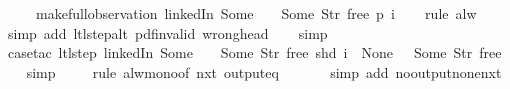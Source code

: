 \begin{isabellebody}
\ \ \ \ \ {\isacharparenleft}make{\isacharunderscore}full{\isacharunderscore}observation\ linkedIn\ {\isacharparenleft}Some\ {}{\isacharparenright}\ {\isacharparenleft}{\isacharless}{\isachargreater}{\isacharparenleft}{}\ {\isachardollar}{\isacharcolon}{\isacharequal}\ Some\ {\isacharparenleft}Str\ {\isacharprime}{\isacharprime}free{\isacharprime}{\isacharprime}{\isacharparenright}{\isacharparenright}{\isacharparenright}\ p\ i{\isacharparenright}{\isachardoublequoteclose}\isanewline
%
\isadelimproof
\ \ %
\endisadelimproof
%
\isatagproof
{}\isamarkupfalse%
\ {\isacharparenleft}rule\ alw{\isacharparenright}\isanewline
\ \ \ \isamarkupfalse%
\ {\isacharparenleft}simp\ add{\isacharcolon}\ ltl{\isacharunderscore}step{\isacharunderscore}alt\ pdf{\isacharunderscore}{}{\isacharunderscore}invalid\ wrong{\isacharunderscore}head{\isacharparenright}\isanewline
\ \ \isamarkupfalse%
\ simp\isanewline
\ \ \isamarkupfalse%
\ {\isacharparenleft}case{\isacharunderscore}tac\ {\isachardoublequoteopen}ltl{\isacharunderscore}step\ linkedIn\ {\isacharparenleft}Some\ {}{\isacharparenright}\ {\isacharparenleft}{\isacharless}{\isachargreater}{\isacharparenleft}{}\ {\isachardollar}{\isacharcolon}{\isacharequal}\ Some\ {\isacharparenleft}Str\ {\isacharprime}{\isacharprime}free{\isacharprime}{\isacharprime}{\isacharparenright}{\isacharparenright}{\isacharparenright}\ {\isacharparenleft}shd\ i{\isacharparenright}\ {\isacharequal}\ {\isacharparenleft}None{\isacharcomma}\ {\isacharbrackleft}{\isacharbrackright}{\isacharcomma}{\isacharparenleft}{\isacharless}{\isachargreater}{\isacharparenleft}{}\ {\isachardollar}{\isacharcolon}{\isacharequal}\ Some\ {\isacharparenleft}Str\ {\isacharprime}{\isacharprime}free{\isacharprime}{\isacharprime}{\isacharparenright}{\isacharparenright}{\isacharparenright}{\isacharparenright}{\isachardoublequoteclose}{\isacharparenright}\isanewline
\ \ \isamarkupfalse%
\ simp\isanewline
\ \ \ \isamarkupfalse%
\ {\isacharparenleft}rule\ alw{\isacharunderscore}mono{\isacharbrackleft}of\ {\isachardoublequoteopen}nxt\ {\isacharparenleft}output{\isacharunderscore}eq\ {\isacharbrackleft}{\isacharbrackright}{\isacharparenright}{\isachardoublequoteclose}{\isacharbrackright}{\isacharparenright}\isanewline
\ \ \ \ \isamarkupfalse%
\ {\isacharparenleft}simp\ add{\isacharcolon}\ no{\isacharunderscore}output{\isacharunderscore}none{\isacharunderscore}nxt{\isacharparenright}\isanewline

\end{isabellebody}
